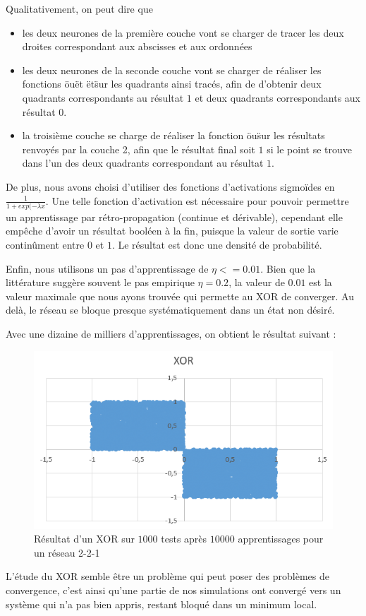 Qualitativement, on peut dire que 
\begin{itemize}
  \item les deux neurones de la première couche vont se charger de tracer les deux droites correspondant aux abscisses et aux ordonnées
  \item les deux neurones de la seconde couche vont se charger de réaliser les fonctions \"ou\" et \"et\" sur les quadrants ainsi tracés, afin de d'obtenir deux quadrants correspondants au résultat $1$ et deux quadrants correspondants aux résultat $0$.
  \item la troisième couche se charge de réaliser la fonction \"ou\" sur les résultats renvoyés par la couche 2, afin que le résultat final soit $1$ si le point se trouve dans l'un des deux quadrants correspondant au résultat $1$.
\end{itemize}

De plus, nous avons choisi d'utiliser des fonctions d'activations sigmoïdes en $\frac{1}{1+exp(-\lambda x}$. Une telle fonction d'activation est nécessaire pour pouvoir permettre un apprentissage par rétro-propagation (continue et dérivable), cependant elle empêche d'avoir un résultat booléen à la fin, puisque la valeur de sortie varie continûment entre $0$ et $1$. Le résultat est donc une densité de probabilité. 

Enfin, nous utilisons un pas d'apprentissage de $\eta <= 0.01$. Bien que la littérature suggère souvent le pas empirique $\eta = 0.2$, la valeur de $0.01$ est la valeur maximale que nous ayons trouvée qui permette au XOR de converger. Au delà, le réseau se bloque presque systématiquement dans un état non désiré.

Avec une dizaine de milliers d'apprentissages, on obtient le résultat suivant : 

\begin{figure}[h!]
  \centering
  \includegraphics[scale=0.5]{images/resultat_xor.png}
  \caption{Résultat d'un XOR sur $1000$ tests après $10000$ apprentissages pour un réseau 2-2-1}
\end{figure}

L'étude du XOR semble être un problème qui peut poser des problèmes de convergence, c'est ainsi qu'une partie de nos simulations ont convergé vers un système qui n'a pas bien appris, restant bloqué dans un minimum local.